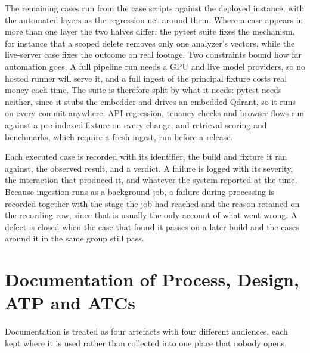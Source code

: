 \documentclass[11pt,a4paper]{article}
\begin{document}
The remaining cases run from the case scripts against the deployed instance,
with the automated layers as the regression net around them. Where a case
appears in more than one layer the two halves differ: the pytest suite fixes the
mechanism, for instance that a scoped delete removes only one analyzer's
vectors, while the live-server case fixes the outcome on real footage. Two
constraints bound how far automation goes. A full pipeline run needs a GPU and
live model providers, so no hosted runner will serve it, and a full ingest of
the principal fixture costs real money each time. The suite is therefore split
by what it needs: pytest needs neither, since it stubs the embedder and drives
an embedded Qdrant, so it runs on every commit anywhere; API regression, tenancy
checks and browser flows run against a pre-indexed fixture on every change; and
retrieval scoring and benchmarks, which require a fresh ingest, run before a
release.

Each executed case is recorded with its identifier, the build and fixture it ran
against, the observed result, and a verdict. A failure is logged with its
severity, the interaction that produced it, and whatever the system reported at
the time. Because ingestion runs as a background job, a failure during
processing is recorded together with the stage the job had reached and the
reason retained on the recording row, since that is usually the only account of
what went wrong. A defect is closed when the case that found it passes on a
later build and the cases around it in the same group still pass.

\section{Documentation of Process, Design, ATP and ATCs}

Documentation is treated as four artefacts with four different audiences, each
kept where it is used rather than collected into one place that nobody opens.
\end{document}
